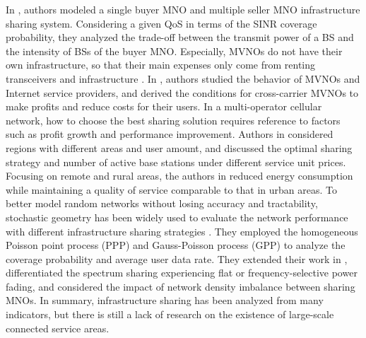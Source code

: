 In \cite{8329530}, authors modeled a single buyer MNO and multiple seller MNO infrastructure sharing system. Considering a given QoS in terms of the SINR coverage probability, they analyzed the trade-off between the transmit power of a BS and the intensity of BSs of the buyer MNO. Especially, MVNOs do not have their own infrastructure, so that their main expenses only come from renting transceivers and infrastructure \cite{7105671}. In \cite{zheng2017economic}, authors studied the behavior of MVNOs and Internet service providers, and derived the conditions for cross-carrier MVNOs to make profits and reduce costs for their users.
In a multi-operator cellular network, how to choose the best sharing solution requires reference to factors such as profit growth and performance improvement. Authors in \cite{cano2017optimal} considered regions with different areas and user amount, and discussed the optimal sharing strategy and number of active base stations under different service unit prices. Focusing on remote and rural areas, the authors in \cite{dlamini2021remote} reduced energy consumption while maintaining a quality of service comparable to that in urban areas. To better model random networks without losing accuracy and tractability, stochastic geometry has been widely used to evaluate the network performance with different infrastructure sharing strategies \cite{hmamouche2021new}.
They employed the homogeneous Poisson point process (PPP) and Gauss-Poisson process (GPP) to analyze the coverage probability and average user data rate. They extended their work in \cite{7876864}, differentiated the spectrum sharing experiencing flat or frequency-selective power fading, and considered the impact of network density imbalance between sharing MNOs. In summary, infrastructure sharing has been analyzed from many indicators, but there is still a lack of research on the existence of large-scale connected service areas.

